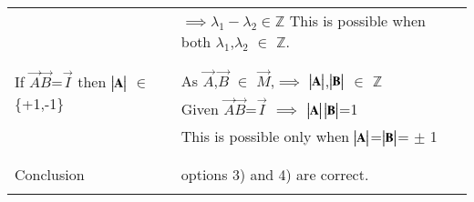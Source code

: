 \documentclass[journal,12pt]{IEEEtran}
\begin{document}
\begin{longtable}{|l|l|}
	& \qquad \qquad$\implies \lambda_1-\lambda_2 \in \mathbb{Z}$ 
	This is possible when both $\lambda_1$,$\lambda_2$ $\in$ $\mathbb{Z}$.\\
	& \\
	\hline
	\multirow{3}{*}{If $\vec{A} \vec{B}$=$\vec{I}$ then $\begin{vmatrix}\mathbf{A}\end{vmatrix}$ $\in$ \{+1,-1\}} 
	& \\
	& As $\vec{A}$,$\vec{B}$ $\in$ $\vec{M}$,$\implies$ $\begin{vmatrix}\mathbf{A}\end{vmatrix}$,$\begin{vmatrix}\mathbf{B}\end{vmatrix}$ $\in$ $\mathbb{Z}$ \\
	& Given $\vec{A}\vec{B}$=$\vec{I}$ $\implies$ $\begin{vmatrix}\mathbf{A}\end{vmatrix}\begin{vmatrix}\mathbf{B}\end{vmatrix}$=1\\
	& This is possible only when $\begin{vmatrix}\mathbf{A}\end{vmatrix}$=$\begin{vmatrix}\mathbf{B}\end{vmatrix}$= $\pm$ 1\\
	& \\
	\hline
	\multirow{3}{*}{Conclusion} & \\
	& options 3) and 4) are correct.\\
    & \\
	\hline
    \end{longtable}
\end{document}
